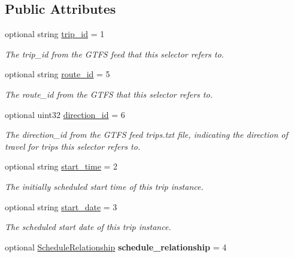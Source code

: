 \subsection*{Public Attributes}
\begin{DoxyCompactItemize}
\item 
optional string \hyperlink{structTripDescriptor_a6939be856ffede4c8b9e54b8f7a4d311}{trip\+\_\+id} = 1
\begin{DoxyCompactList}\small\item\em The trip\+\_\+id from the G\+T\+FS feed that this selector refers to. \end{DoxyCompactList}\item 
optional string \hyperlink{structTripDescriptor_a46ee0f9073f22f5d81ab9dc510aca904}{route\+\_\+id} = 5\hypertarget{structTripDescriptor_a46ee0f9073f22f5d81ab9dc510aca904}{}\label{structTripDescriptor_a46ee0f9073f22f5d81ab9dc510aca904}

\begin{DoxyCompactList}\small\item\em The route\+\_\+id from the G\+T\+FS that this selector refers to. \end{DoxyCompactList}\item 
optional uint32 \hyperlink{structTripDescriptor_a02d3a6531b0514b318dccd7edf4a3fee}{direction\+\_\+id} = 6
\begin{DoxyCompactList}\small\item\em The direction\+\_\+id from the G\+T\+FS feed trips.\+txt file, indicating the direction of travel for trips this selector refers to. \end{DoxyCompactList}\item 
optional string \hyperlink{structTripDescriptor_a799660dd75143d643c5552ac945fe16e}{start\+\_\+time} = 2
\begin{DoxyCompactList}\small\item\em The initially scheduled start time of this trip instance. \end{DoxyCompactList}\item 
optional string \hyperlink{structTripDescriptor_a24d4363686da053b0eadbf04313a5055}{start\+\_\+date} = 3
\begin{DoxyCompactList}\small\item\em The scheduled start date of this trip instance. \end{DoxyCompactList}\item 
optional \hyperlink{structTripDescriptor_a3edbca669de2c1c3350403537b24a26e}{Schedule\+Relationship} {\bfseries schedule\+\_\+relationship} = 4\hypertarget{structTripDescriptor_ab800b567a069f306089e4aecc82cbff9}{}\label{structTripDescriptor_ab800b567a069f306089e4aecc82cbff9}


\end{DoxyCompactItemize}
